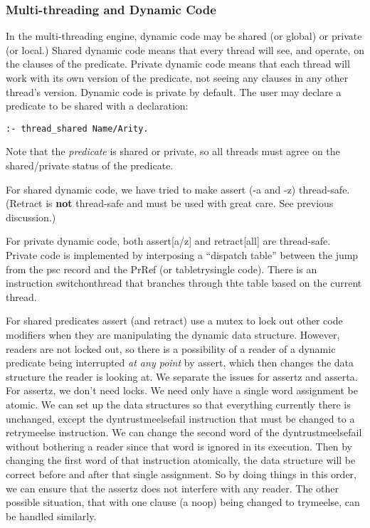 \documentclass[11pt]{article}
\begin{document}
\subsubsection{Multi-threading and Dynamic Code}
In the multi-threading engine, dynamic code may be shared (or global)
or private (or local.)  Shared dynamic code means that every thread
will see, and operate, on the clauses of the predicate.  Private
dynamic code means that each thread will work with its own version of
the predicate, not seeing any clauses in any other thread's version.
Dynamic code is private by default.  The user may declare a predicate
to be shared with a declaration:
\begin{verbatim}
:- thread_shared Name/Arity.
\end{verbatim}
Note that the {\em predicate} is shared or private, so all threads
must agree on the shared/private status of the predicate.

For shared dynamic code, we have tried to make assert (-a and -z)
thread-safe.  (Retract is {\bf not} thread-safe and must be used with
great care.  See previous discussion.)

For private dynamic code, both assert[a/z] and retract[all] are
thread-safe.  Private code is implemented by interposing a ``dispatch
table'' between the jump from the psc record and the PrRef (or
tabletrysingle code).  There is an instruction switchonthread that
branches through thte table based on the current thread.

For shared predicates assert (and retract) use a mutex to lock out
other code modifiers when they are manipulating the dynamic data
structure.  However, readers are not locked out, so there is a
possibility of a reader of a dynamic predicate being interrupted {\em
at any point} by assert, which then changes the data structure the
reader is looking at.  We separate the issues for assertz and asserta.
For assertz, we don't need locks.  We need only have a single word
assignment be atomic.  We can set up the data structures so that
everything currently there is unchanged, except the dyntrustmeelsefail
instruction that must be changed to a retrymeelse instruction.  We can
change the second word of the dyntrustmeelsefail without bothering a
reader since that word is ignored in its execution.  Then by changing
the first word of that instruction atomically, the data structure will
be correct before and after that single assignment.  So by doing
things in this order, we can ensure that the assertz does not
interfere with any reader.  The other possible situation, that with
one clause (a noop) being changed to trymeelse, can be handled
similarly.
\end{document}
